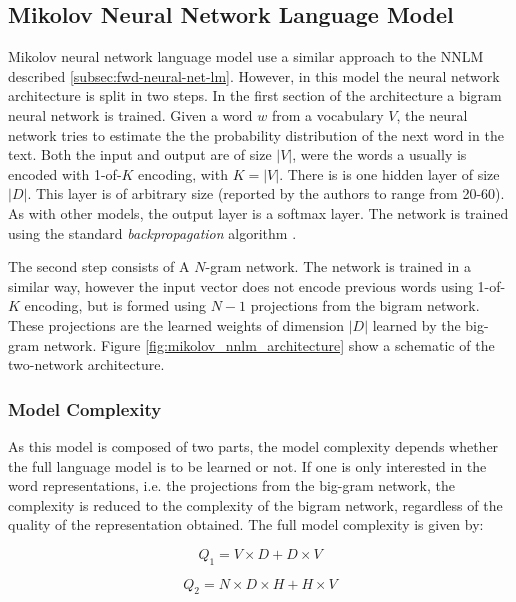 \subsection{Mikolov Neural Network Language Model}
\label{sec:mikolov-neural-net-model}



Mikolov neural network language model use a similar  approach to the
\ac{NNLM} described  \ref{subsec:fwd-neural-net-lm}. However, in this model  the neural
network architecture is split in two steps. In the first section of  the
architecture  a bigram neural network is trained. Given a word $w$ from a vocabulary $V$, the neural
network tries to estimate the the probability distribution of the next word
in the text. Both the input and output are of size $|V|$, were the words a
usually is encoded with 1-of-$K$ encoding, with $K=|V|$.  There is is one hidden layer of
size $|D|$. This layer is of  arbitrary size (reported by the authors  to
range from 20-60). As with other models, the output layer  is a  softmax
layer. The network is trained  using the standard \textit{backpropagation}
algorithm \cite{conf/icassp/MikolovKBGC09}. 

The second step consists of  A $N$-gram network. The network is trained in a
similar way, however the input vector does not encode previous words using 1-of-$K$ encoding, but is formed using $N-1$ projections from
the  bigram network. These projections are the learned weights of dimension
$|D|$ learned by the big-gram network. Figure
\ref{fig:mikolov_nnlm_architecture} show a schematic of the two-network architecture.


\subsubsection{Model Complexity}

As this model is composed of two parts, the model complexity depends whether
the full language model is to be learned or not. If one is only interested in
the word representations, i.e. the projections from the big-gram network,  the
complexity is reduced to the complexity of the bigram network, regardless of
the quality of the representation obtained.  The full model
complexity is given by: 


\begin{equation} Q_1 = V \times D + D \times V  \end{equation}

\begin{equation} Q_2 =  N \times D \times H + H \times V   \end{equation}

